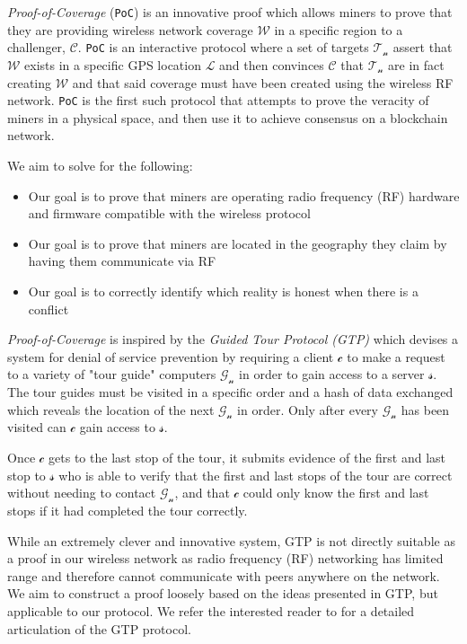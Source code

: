 \documentclass[letterpaper,11pt]{article}
\def\coverage/{$\mathcal{W}$}
\def\location/{$\mathcal{L}$}
\def\proofofcoverage/{\textit{Proof-of-Coverage}}
\begin{document}
\proofofcoverage/ (\verb|PoC|) is an innovative proof which allows miners to prove that they are providing wireless network coverage \coverage/ in a specific region to a challenger, $\mathcal{C}$. \verb|PoC| is an interactive protocol where a set of targets $\mathcal{T_n}$ assert that \coverage/ exists in a specific GPS location \location/ and then convinces $\mathcal{C}$ that $\mathcal{T_n}$ are in fact creating \coverage/ and that said coverage must have been created using the wireless RF network. \verb|PoC| is the first such protocol that attempts to prove the veracity of miners in a physical space, and then use it to achieve consensus on a blockchain network.\newline

We aim to solve for the following:

\begin{itemize}
	\item Our goal is to prove that miners are operating radio frequency (RF) hardware and firmware compatible with the wireless protocol
	\item Our goal is to prove that miners are located in the geography they claim by having them communicate via RF
	\item Our goal is to correctly identify which reality is honest when there is a conflict
\end{itemize}

\proofofcoverage/ is inspired by the \textit{Guided Tour Protocol (GTP)} which devises a system for denial of service prevention by requiring a client $\mathcal{c}$ to make a request to a variety of "tour guide" computers $\mathcal{G_n}$ in order to gain access to a server $\mathcal{s}$. The tour guides must be visited in a specific order and a hash of data exchanged which reveals the location of the next $\mathcal{G_n}$ in order. Only after every $\mathcal{G_n}$ has been visited can $\mathcal{c}$ gain access to $\mathcal{s}$.\newline

Once $\mathcal{c}$ gets to the last stop of the tour, it submits evidence of the first and last stop to $\mathcal{s}$ who is able to verify that the first and last stops of the tour are correct without needing to contact $\mathcal{G_n}$, and that $\mathcal{c}$ could only know the first and last stops if it had completed the tour correctly.\newline

While an extremely clever and innovative system, GTP is not directly suitable as a proof in our wireless network as radio frequency (RF) networking has limited range and therefore cannot communicate with peers anywhere on the network. We aim to construct a proof loosely based on the ideas presented in GTP, but applicable to our protocol. We refer the interested reader to \cite{gtp} for a detailed articulation of the GTP protocol.
\end{document}
